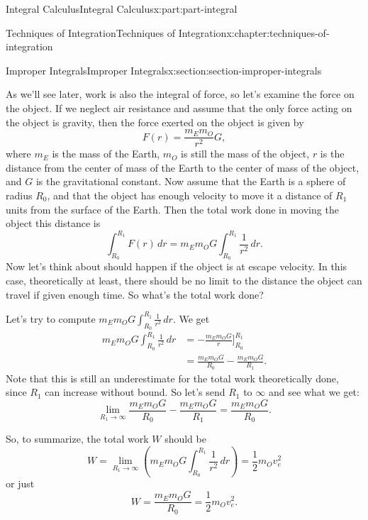 \documentclass[twoside,10pt,]{tufte-book}
\numberwithin{equation}{part}
\begin{document}
\begin{partptx}{Integral Calculus}{}{Integral Calculus}{}{}{x:part:part-integral}
\begin{chapterptx}{Techniques of Integration}{}{Techniques of Integration}{}{}{x:chapter:techniques-of-integration}
\begin{sectionptx}{Improper Integrals}{}{Improper Integrals}{}{}{x:section:section-improper-integrals}
\begin{introduction}{}
\par
As we'll see later, work is also the integral of force, so let's examine the force on the object. If we neglect air resistance and assume that the only force acting on the object is gravity, then the force exerted on the object is given by%
\begin{equation*}
F(r) = \frac{m_{E}m_{O}}{r^{2}}G,
\end{equation*}
where \(m_{E}\) is the mass of the Earth, \(m_{O}\) is still the mass of the object, \(r\) is the distance from the center of mass of the Earth to the center of mass of the object, and \(G\) is the gravitational constant. Now assume that the Earth is a sphere of radius \(R_{0}\), and that the object has enough velocity to move it a distance of \(R_{1}\) units from the surface of the Earth. Then the total work done in moving the object this distance is%
\begin{equation*}
\int_{R_{0}}^{R_{1}}F(r)\,dr = m_{E}m_{O}G\int_{R_{0}}^{R_{1}}\frac{1}{r^{2}}\,dr.
\end{equation*}
Now let's think about should happen if the object is at escape velocity. In this case, theoretically at least, there should be no limit to the distance the object can travel if given enough time. So what's the total work done?%
\par
Let's try to compute \(m_{E}m_{O}G\int_{R_{0}}^{R_{1}}\frac{1}{r^{2}}\,dr.\) We get%
\begin{align*}
m_{E}m_{O}G\int_{R_{0}}^{R_{1}}\frac{1}{r^{2}}\,dr & = -\frac{m_{E}m_{O}G}{r}\big]_{R_{0}}^{R_{1}} \\
& = \frac{m_{E}m_{O}G}{R_{0}} - \frac{m_{E}m_{O}G}{R_{1}}. 
\end{align*}
Note that this is still an underestimate for the total work theoretically done, since \(R_{1}\) can increase without bound. So let's send \(R_{1}\) to \(\infty\) and see what we get:%
\begin{equation*}
\lim_{R_{1}\to\infty}\frac{m_{E}m_{O}G}{R_{0}} - \frac{m_{E}m_{O}G}{R_{1}} = \frac{m_{E}m_{O}G}{R_{0}}.
\end{equation*}
%
\par
So, to summarize, the total work \(W\) should be%
\begin{equation*}
W = \lim_{R_{1}\to\infty}\left(m_{E}m_{O}G\int_{R_{0}}^{R_{1}}\frac{1}{r^{2}}\,dr\right) = \frac{1}{2}m_{O}v_{e}^{2}
\end{equation*}
or just%
\begin{equation*}
W = \frac{m_{E}m_{O}G}{R_{0}} = \frac{1}{2}m_{O}v_{e}^{2}.

\end{equation*}
\end{introduction}
\end{sectionptx}
\end{chapterptx}
\end{partptx}
\end{document}
